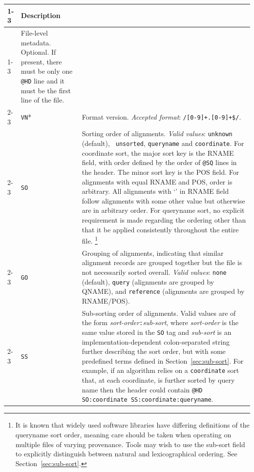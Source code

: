 \documentclass[10pt]{article}
\begin{document}
\begin{center}
\small
\begin{longtable}{|l|l|p{13.5cm}|}
  \cline{1-3}
  \multicolumn{2}{|l|}{\bf Tag} & {\bf Description} \\
  \cline{1-3}
  \endfirsthead
  \cline{1-3}
  \endhead
  \multicolumn{2}{|l}{\tt @HD} & File-level metadata. Optional. If present, there must be only one {\tt @HD} line and it must be the first line of the file. \\\cline{2-3}
  & {\tt VN}* & Format version. \emph{Accepted format}: {\tt /\char94[0-9]+\char92.[0-9]+\$/}.\\\cline{2-3}
  & {\tt SO} & Sorting order of alignments. \emph{Valid values}: {\tt unknown} (default), {\tt
    unsorted}, {\tt queryname} and {\tt coordinate}. For coordinate sort, the major sort
  key is the {\sf RNAME} field, with order defined by the order of {\tt @SQ} lines in the header.  The
  minor sort key is the {\sf POS} field.  For alignments with equal {\sf RNAME} and {\sf POS}, order is
  arbitrary.  All alignments with `{\tt *}' in {\sf RNAME} field follow alignments with some other
  value but otherwise are in arbitrary order.
  For queryname sort, no explicit requirement is made regarding the ordering other than that it be applied consistently throughout the entire file.%
  \footnote{It is known that widely used software libraries have differing definitions of the queryname sort order, meaning care should be taken when operating on multiple files of varying provenance.
  Tools may wish to use the sub-sort field to explicitly distinguish between natural and lexicographical ordering.  See Section~\ref{sec:sub-sort}.}\\\cline{2-3}
  & {\tt GO} & Grouping of alignments, indicating that similar alignment records
    are grouped together but the file is not necessarily sorted overall.
    \emph{Valid values}: {\tt none} (default), {\tt query} (alignments are
    grouped by {\sf QNAME}), and {\tt reference} (alignments are grouped by
    {\sf RNAME}/{\sf POS}).\\\cline{2-3}
  & {\tt SS} & Sub-sorting order of alignments. Valid values are of the form \emph{sort-order}{\tt :}\emph{sub-sort}, where \emph{sort-order} is the same value stored in the {\tt SO} tag and \emph{sub-sort} is an implementation-dependent colon-separated string further describing the sort order, but with some predefined terms defined in Section~\ref{sec:sub-sort}.
    For example, if an algorithm relies on a {\tt coordinate} sort that, at each coordinate, is further sorted by query name then the header could contain {\tt @HD SO:coordinate SS:coordinate:queryname}.%

\end{longtable}
\end{center}
\end{document}
